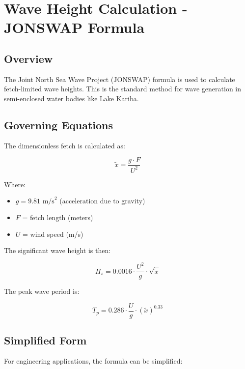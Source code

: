 \documentclass[12pt]{article}
\begin{document}
\newpage

\section{Wave Height Calculation - JONSWAP Formula}

\subsection{Overview}

The Joint North Sea Wave Project (JONSWAP) formula is used to calculate fetch-limited wave heights. This is the standard method for wave generation in semi-enclosed water bodies like Lake Kariba.

\subsection{Governing Equations}

The dimensionless fetch is calculated as:

\begin{equation}
\tilde{x} = \frac{g \cdot F}{U^2}
\end{equation}

Where:
\begin{itemize}
    \item $g = 9.81 \text{ m/s}^2$ (acceleration due to gravity)
    \item $F$ = fetch length (meters)
    \item $U$ = wind speed (m/s)
\end{itemize}

The significant wave height is then:

\begin{equation}
H_s = 0.0016 \cdot \frac{U^2}{g} \cdot \sqrt{\tilde{x}}
\end{equation}

The peak wave period is:

\begin{equation}
T_p = 0.286 \cdot \frac{U}{g} \cdot (\tilde{x})^{0.33}
\end{equation}

\subsection{Simplified Form}

For engineering applications, the formula can be simplified:
\end{document}
